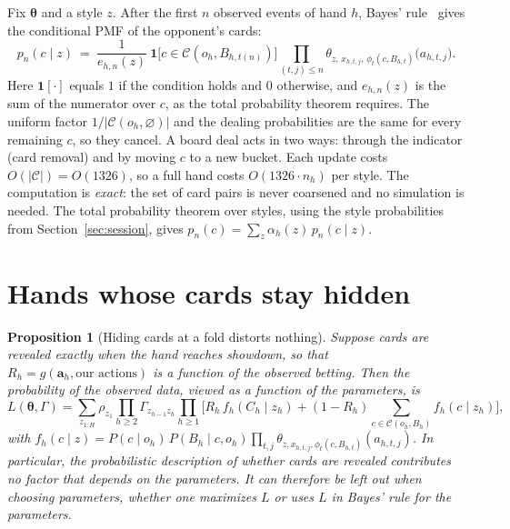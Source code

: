 \documentclass[11pt,a4paper]{article}
\newtheorem{proposition}{Proposition}
\newcommand{\C}{C}            %
\newcommand{\B}{B}            %
\newcommand{\R}{R}            %
\newcommand{\1}{\mathbf{1}}
\newcommand{\BT}[1]{\cite[§#1]{bertsekas2000}}
\begin{document}
Fix $\bm\theta$ and a style $z$. After the first $n$ observed events of hand
$h$, Bayes' rule~\BT{1.4} gives the conditional PMF of the opponent's cards:
\begin{equation}
  p_n(c\mid z)\ =\ \frac{1}{e_{h,n}(z)}\ \1\big[c\in\mathcal{C}(o_h,\B_{h,t(n)})\big]
  \prod_{(t,j)\le n} \theta_{z,\,x_{h,t,j},\,\phi_t(c,\B_{h,t})}\big(a_{h,t,j}\big).
  \label{eq:filter}
\end{equation}
Here $\1[\cdot]$ equals $1$ if the condition holds and $0$ otherwise, and
$e_{h,n}(z)$ is the sum of the numerator over $c$, as the total probability
theorem requires. The uniform factor $1/|\mathcal{C}(o_h,\varnothing)|$ and the
dealing probabilities are the same for every remaining $c$, so they cancel.
A board deal acts in two ways: through the indicator (card removal) and by
moving $c$ to a new bucket. Each update costs $O(|\mathcal{C}|)=O(1326)$, so a
full hand costs $O(1326\cdot n_h)$ per style. The computation is \emph{exact}:
the set of card pairs is never coarsened and no simulation is needed. The
total probability theorem over styles, using the style probabilities from
Section~\ref{sec:session}, gives
$p_n(c)=\sum_z \alpha_{h}(z)\,p_n(c\mid z)$.

\section{Hands whose cards stay hidden}\label{sec:censoring}

\begin{proposition}[Hiding cards at a fold distorts nothing]\label{prop:ignorable}
Suppose cards are revealed exactly when the hand reaches showdown, so that
$\R_h=g(\mathbf{a}_h,\text{our actions})$ is a function of the observed
betting. Then the probability of the observed data, viewed as a function of
the parameters, is
\begin{equation}
  L(\bm\theta,\Gamma)=\sum_{z_{1:H}}\rho_{z_1}\prod_{h\ge2} \Gamma_{z_{h-1}z_h}\prod_{h\ge1}
  \Big[\R_h\, f_h(\C_h\mid z_h) + (1-\R_h)\!\!\sum_{c\in\mathcal{C}(o_h,\B_h)}\! f_h(c\mid z_h)\Big],
  \label{eq:lik}
\end{equation}
with $f_h(c\mid z)=P(c\mid o_h)\,P(\B_h\mid c,o_h)\prod_{t,j}\theta_{z,x_{h,t,j},\phi_t(c,\B_{h,t})}(a_{h,t,j})$.
In particular, the probabilistic description of \emph{whether} cards are
revealed contributes no factor that depends on the parameters. It can
therefore be left out when choosing parameters, whether one maximizes $L$ or
uses $L$ in Bayes' rule for the parameters.
\end{proposition}
\end{document}
